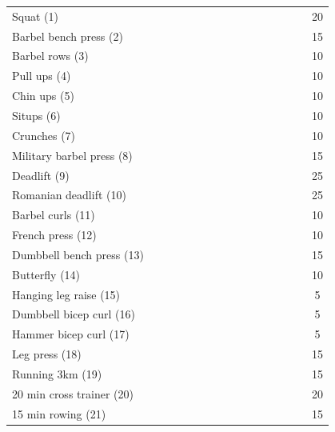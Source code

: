 \documentclass[11pt]{article}
\newcommand{\colorCell}{\cellcolor{blue!25}}
\begin{document}
\begin{landscape}
\begin{table}
{\begin{tabular}{l c c c c c c c c c c c c c |c| c}
		\multicolumn{1}{l|}{Squat (1)} 				&&\colorCell&\colorCell&\colorCell&&&&&&&&&\colorCell& & 20\\
		\multicolumn{1}{l|}{Barbel bench press (2)}	&&&&&\colorCell&\colorCell&\colorCell&\colorCell&\colorCell&&&&\colorCell& & 15\\
		\multicolumn{1}{l|}{Barbel rows (3)}		&&&\colorCell&&&&\colorCell&&\colorCell&\colorCell&&&\colorCell& & 10\\
		\multicolumn{1}{l|}{Pull ups (4)}			&&&&&&&\colorCell&\colorCell&&\colorCell&&&\colorCell& & 10\\
		\multicolumn{1}{l|}{Chin ups (5)}			&&&&&&&\colorCell&\colorCell&&\colorCell&&&\colorCell& & 10 \\
		\multicolumn{1}{l|}{Situps (6)}				&&&&&&&&&&&\colorCell&&&\colorCell & 10\\
		\multicolumn{1}{l|}{Crunches (7)}			&&&&&&&&&&&\colorCell&&&\colorCell & 10\\
		\multicolumn{1}{l|}{Military barbel press (8)}&&&&&\colorCell&\colorCell&\colorCell&\colorCell&&&&&\colorCell& & 15\\
		\multicolumn{1}{l|}{Deadlift (9)}         &\colorCell&\colorCell&\colorCell&\colorCell&&&\colorCell&\colorCell&\colorCell&&\colorCell&&\colorCell& & 25\\
		\multicolumn{1}{l|}{Romanian deadlift (10)}	&\colorCell&\colorCell&\colorCell&&&&\colorCell&\colorCell&\colorCell&&&&\colorCell& & 25\\
		\multicolumn{1}{l|}{Barbel curls (11)}		&&&&&&&&&&\colorCell&&&&\colorCell & 10\\
		\multicolumn{1}{l|}{French press (12)}		&&&&&&\colorCell&&&&&&&&\colorCell & 10\\
		\multicolumn{1}{l|}{Dumbbell bench press (13)}&&&&&\colorCell&\colorCell&&&&&&&\colorCell& & 15\\
		\multicolumn{1}{l|}{Butterfly (14)}			&&&&&\colorCell&\colorCell&\colorCell&&\colorCell&&&&&\colorCell & 10\\
		\multicolumn{1}{l|}{Hanging leg raise (15)}	&&&&&&&&&\colorCell&&\colorCell&&&\colorCell & 5\\
		\multicolumn{1}{l|}{Dumbbell bicep curl (16)}&&&&&&&&&&\colorCell&&&&\colorCell & 5\\
		\multicolumn{1}{l|}{Hammer bicep curl (17)}	&&&&&&&&&&\colorCell&&&&\colorCell & 5\\
		\multicolumn{1}{l|}{Leg press (18)}			&&\colorCell&&\colorCell&&&&&&&&&&\colorCell & 15\\
		\multicolumn{1}{l|}{Running 3km (19)}		&&&&&&&&&&&&\colorCell&\colorCell& & 15\\
		\multicolumn{1}{l|}{20 min cross trainer (20)}&&&&&&&&&&&&\colorCell&& & 20\\
		\multicolumn{1}{l|}{15 min rowing (21)}		&&&&&&&&&&&&\colorCell&\colorCell& & 15\\
		\bottomrule
	\end{tabular}}
\end{table}
\end{landscape}
\end{document}
